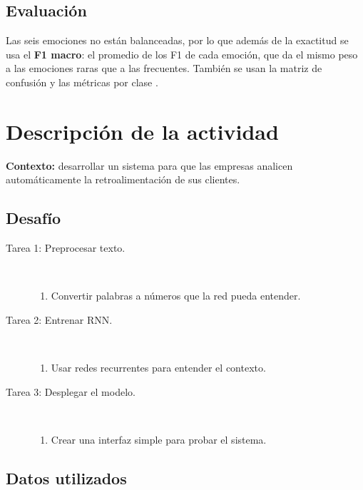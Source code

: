 \documentclass[11pt,letterpaper]{article}
\begin{document}
\subsection{Evaluación}

Las seis emociones no están balanceadas, por lo que además de la exactitud se usa el \textbf{F1 macro}: el promedio de los F1 de cada emoción, que da el mismo peso a las emociones raras que a las frecuentes. También se usan la matriz de confusión y las métricas por clase \parencite{iae_u4_t44}.

\section{Descripción de la actividad}

\textbf{Contexto:} desarrollar un sistema para que las empresas analicen automáticamente la retroalimentación de sus clientes.

\subsection*{Desafío}

\begin{description}
    \item[Tarea 1: Preprocesar texto.]\mbox{}\\[-1.3\baselineskip]
    \begin{enumerate}
        \item Convertir palabras a números que la red pueda entender.
    \end{enumerate}
    \item[Tarea 2: Entrenar RNN.]\mbox{}\\[-1.3\baselineskip]
    \begin{enumerate}
        \item Usar redes recurrentes para entender el contexto.
    \end{enumerate}
    \item[Tarea 3: Desplegar el modelo.]\mbox{}\\[-1.3\baselineskip]
    \begin{enumerate}
        \item Crear una interfaz simple para probar el sistema.
    \end{enumerate}
\end{description}

\subsection*{Datos utilizados}
\end{document}
